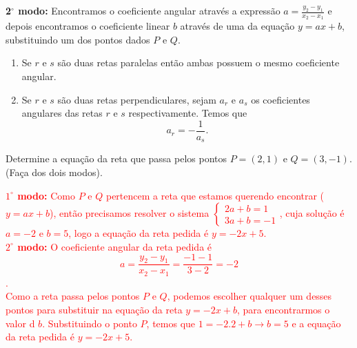 \textbf{2{$^\circ$} modo:} Encontramos o coeficiente angular através a expressão $a= \frac{y_2-y_1}{x_2-x_1}$ e depois encontramos o coeficiente linear $b$ através de uma da equação $y=ax+b$, substituindo um dos pontos dados $P$ e $Q$.
\begin{obs}
	\begin{enumerate}
		\item Se $r$ e $s$ são duas retas paralelas então ambas possuem o mesmo coeficiente angular.
		\item Se $r$ e $s$ são duas retas perpendiculares, sejam $a_r$ e $a_s$ os coeficientes angulares das retas $r$ e $s$ respectivamente. Temos que
		\[a_r=-\frac{1}{a_s}.\]
	\end{enumerate}
\end{obs}

\begin{exe} Determine a equação da reta que passa pelos pontos $P=(2,1)$ e $Q=(3,-1)$. (Faça dos dois modos).
\end{exe}
\textcolor{red}{\textbf{$1^{\circ}$ modo:} Como $P$ e $Q$ pertencem a reta que estamos querendo encontrar ($y=ax+b$), então precisamos resolver o sistema $\begin{cases}
2a+b=1 \\
3a+b=-1
\end{cases}$, cuja solução é $a=-2$ e $b=5$, logo a equação da reta pedida é $y=-2x+5$.} \\
\textcolor{red}{\textbf{$2^{\circ}$ modo:} O coeficiente angular da reta pedida é $$a= \frac{y_2-y_1}{x_2-x_1}=\frac{-1-1}{3-2}=-2$$. \\Como a reta passa pelos pontos $P$ e $Q$, podemos escolher qualquer um desses pontos para substituir na equação da reta $y=-2x+b$, para encontrarmos o valor d $b$. Substituindo o ponto $P$, temos que $1=-2.2+b \to b=5$  e a equação da reta pedida é $y=-2x+5$. }
